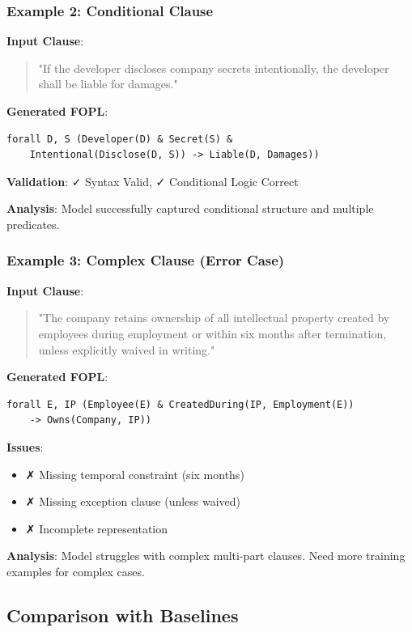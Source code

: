 \documentclass[12pt,a4paper]{article}
\begin{document}
\subsubsection{Example 2: Conditional Clause}

\textbf{Input Clause}:
\begin{quote}
"If the developer discloses company secrets intentionally, 
the developer shall be liable for damages."
\end{quote}

\textbf{Generated FOPL}:
\begin{verbatim}
forall D, S (Developer(D) & Secret(S) & 
    Intentional(Disclose(D, S)) -> Liable(D, Damages))
\end{verbatim}

\textbf{Validation}: ✓ Syntax Valid, ✓ Conditional Logic Correct

\textbf{Analysis}: Model successfully captured conditional structure and multiple predicates.

\subsubsection{Example 3: Complex Clause (Error Case)}

\textbf{Input Clause}:
\begin{quote}
"The company retains ownership of all intellectual property 
created by employees during employment or within six months 
after termination, unless explicitly waived in writing."
\end{quote}

\textbf{Generated FOPL}:
\begin{verbatim}
forall E, IP (Employee(E) & CreatedDuring(IP, Employment(E))
    -> Owns(Company, IP))
\end{verbatim}

\textbf{Issues}:
\begin{itemize}
    \item ✗ Missing temporal constraint (six months)
    \item ✗ Missing exception clause (unless waived)
    \item ✗ Incomplete representation
\end{itemize}

\textbf{Analysis}: Model struggles with complex multi-part clauses. Need more training examples for complex cases.

\subsection{Comparison with Baselines}
\end{document}
